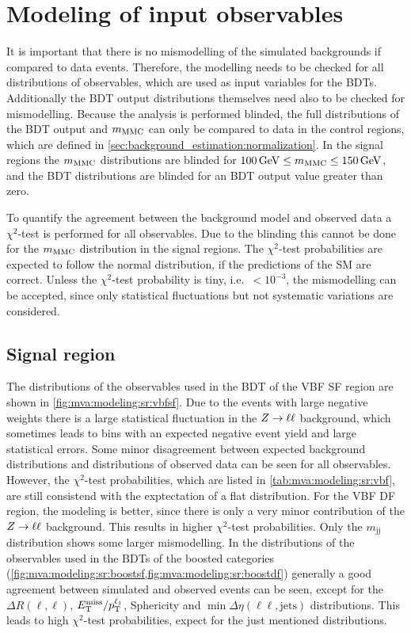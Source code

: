 \section{Modeling of input observables}\label{sec:mva:modeling}

It is important that there is no mismodelling of the simulated backgrounds if compared to data events.
Therefore, the modelling needs to be checked for all distributions of observables, which are used as input variables for the BDTs.
Additionally the BDT output distributions themselves need also to be checked for mismodelling.
Because the analysis is performed blinded, the full distributions of the BDT output and $m_\text{MMC}$ can only be compared to data in the control regions, which
are defined in \cref{sec:background_estimation:normalization}.
In the signal regions the $m_\text{MMC}$ distributions are blinded for $\SI{100}{\GeV} \leq \mmc \leq \SI{150}{\GeV}$,
and the BDT distributions are blinded for an BDT output value greater than zero.

To quantify the agreement between the background model and observed data a $\chi^2$-test is performed for all observables.
Due to the blinding this cannot be done for the $m_\text{MMC}$ distribution in the signal regions.
The $\chi^2$-test probabilities are expected to follow the normal distribution, if the predictions of the SM are correct.
Unless the $\chi^2$-test probability is tiny, i.e.\ $< 10^{-3}$, the mismodelling can be accepted, since only statistical fluctuations but
not systematic variations are considered.

\subsection{Signal region}

The distributions of the observables used in the BDT of the VBF SF region are shown in \cref{fig:mva:modeling:sr:vbfsf}.
Due to the events with large negative weights there is a large statistical fluctuation in the $Z \to \ell \ell$ background, which sometimes leads
to bins with an expected negative event yield and large statistical errors.
Some minor disagreement between expected background distributions and distributions of observed data can be seen for
all observables.
However, the $\chi^2$-test probabilities, which are listed in \cref{tab:mva:modeling:sr:vbf}, are still consistend with the exptectation of a flat distribution.
For the VBF DF region, the modeling is better, since there is only a very minor contribution of the $Z \to \ell \ell$ background.
This results in higher $\chi^2$-test probabilities.
Only the $m_\text{jj}$ distribution shows some larger mismodelling.
In the distributions of the observables used in the BDTs of the boosted categories (\cref{fig:mva:modeling:sr:boostsf,fig:mva:modeling:sr:boostdf})
generally a good agreement between simulated and observed events can be seen, except for the $\Delta R (\ell, \ell)$,
$E_\text{T}^\text{miss} / p_\text{T}^{\ell_1}$, Sphericity and $\min \Delta \eta (\ell\ell, \text{jets})$ distributions.
This leads to high $\chi^2$-test probabilities, expect for the just mentioned distributions.

